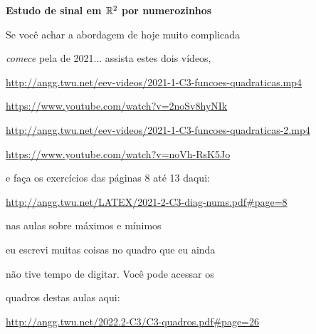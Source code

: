 \documentclass[oneside,12pt]{article}
\begin{document}
\newpage


{\bf Estudo de sinal em $\mathbb{R}^2$ por numerozinhos}

Se você achar a abordagem de hoje muito complicada

{\sl comece} pela de 2021... assista estes dois vídeos,


\ssk

{\scriptsize

\url{http://angg.twu.net/eev-videos/2021-1-C3-funcoes-quadraticas.mp4}

\url{https://www.youtube.com/watch?v=2noSv8hyNIk}

\msk

\url{http://angg.twu.net/eev-videos/2021-1-C3-funcoes-quadraticas-2.mp4}

\url{https://www.youtube.com/watch?v=noVh-RsK5Jo}

}

\msk

e faça os exercícios das páginas 8 até 13 daqui:

\ssk

{\scriptsize

\url{http://angg.twu.net/LATEX/2021-2-C3-diag-nums.pdf#page=8}

}


\bsk

 nas aulas sobre máximos e mínimos

eu escrevi muitas coisas no quadro que eu ainda

não tive tempo de digitar. Você pode acessar os

quadros destas aulas aqui:

{\scriptsize

\ssk

\url{http://angg.twu.net/2022.2-C3/C3-quadros.pdf\#page=26}

}
\end{document}
